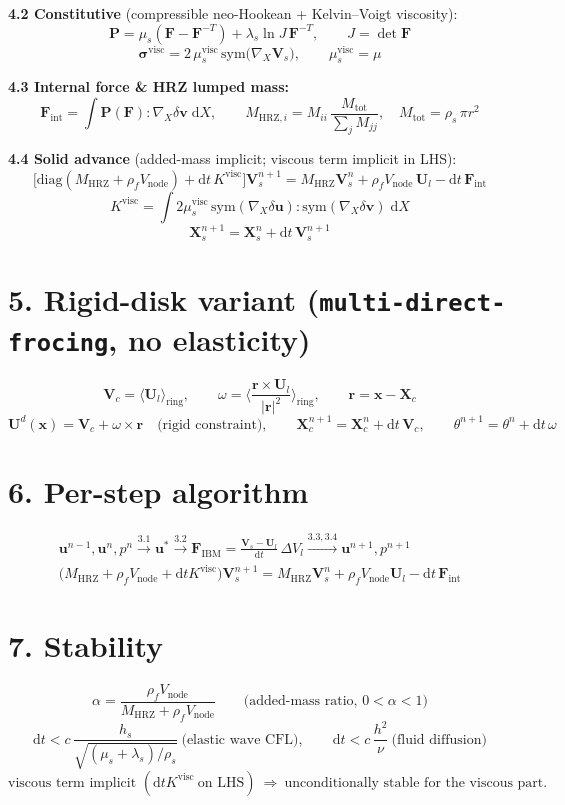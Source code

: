 \documentclass[10pt]{article}
\newcommand{\dd}{\mathrm{d}}
\begin{document}
\textbf{4.2 Constitutive} (compressible neo-Hookean + Kelvin--Voigt viscosity):
\[
\bm P = \mu_s(\bm F-\bm F^{-T})+\lambda_s\ln J\,\bm F^{-T},
\qquad J=\det\bm F
\]
\[
\bm\sigma^{\mathrm{visc}} = 2\,\mu_s^{\mathrm{visc}}\,\mathrm{sym}\big(\nabla_X \bm V_s\big),
\qquad \mu_s^{\mathrm{visc}}=\mu
\]

\textbf{4.3 Internal force \& HRZ lumped mass:}
\[
\bm F_{\mathrm{int}} = \int \bm P(\bm F):\nabla_X\delta\bm v\;\dd X,
\qquad
M_{\mathrm{HRZ},i}=M_{ii}\,\frac{M_{\mathrm{tot}}}{\sum_j M_{jj}},
\quad M_{\mathrm{tot}}=\rho_s\,\pi r^2
\]

\textbf{4.4 Solid advance} (added-mass implicit; viscous term implicit in LHS):
\[
\big[\mathrm{diag}(M_{\mathrm{HRZ}}+\rho_f V_{\mathrm{node}})+\dd t\,K^{\mathrm{visc}}\big]
\bm V_s^{n+1}
= M_{\mathrm{HRZ}}\bm V_s^n
+\rho_f V_{\mathrm{node}}\,\bm U_l
-\dd t\,\bm F_{\mathrm{int}}
\]
\[
K^{\mathrm{visc}} = \int 2\mu_s^{\mathrm{visc}}\,
\mathrm{sym}(\nabla_X\delta\bm u):\mathrm{sym}(\nabla_X\delta\bm v)\;\dd X
\]
\[
\bm X_s^{n+1} = \bm X_s^n + \dd t\,\bm V_s^{n+1}
\]

\section*{5. Rigid-disk variant (\texttt{multi-direct-frocing}, no elasticity)}
\[
\bm V_c=\big\langle \bm U_l\big\rangle_{\mathrm{ring}},
\qquad
\omega=\Big\langle\frac{\bm r\times\bm U_l}{|\bm r|^2}\Big\rangle_{\mathrm{ring}},
\qquad \bm r=\bm x-\bm X_c
\]
\[
\bm U^d(\bm x)=\bm V_c+\omega\times\bm r\quad\text{(rigid constraint)},
\qquad
\bm X_c^{n+1}=\bm X_c^n+\dd t\,\bm V_c,\qquad
\theta^{n+1}=\theta^n+\dd t\,\omega
\]

\section*{6. Per-step algorithm}
\[
\boxed{
\begin{gathered}
\bm u^{n-1},\bm u^n,p^n
\xrightarrow{3.1}\bm u^*
\xrightarrow{3.2}\bm F_{\mathrm{IBM}}=\tfrac{\bm V_s-\bm U_l}{\dd t}\,\Delta V_l
\xrightarrow{3.3,3.4}\bm u^{n+1},p^{n+1}\\[2mm]
\big(M_{\mathrm{HRZ}}+\rho_f V_{\mathrm{node}}+\dd t K^{\mathrm{visc}}\big)\bm V_s^{n+1}
= M_{\mathrm{HRZ}}\bm V_s^n+\rho_f V_{\mathrm{node}}\bm U_l-\dd t\,\bm F_{\mathrm{int}}
\end{gathered}
}
\]

\section*{7. Stability}
\[
\alpha=\frac{\rho_f V_{\mathrm{node}}}{M_{\mathrm{HRZ}}+\rho_f V_{\mathrm{node}}}
\qquad\text{(added-mass ratio, }0<\alpha<1\text{)}
\]
\[
\dd t<c\,\frac{h_s}{\sqrt{(\mu_s+\lambda_s)/\rho_s}}\ \text{(elastic wave CFL)},
\qquad
\dd t<c\,\frac{h^2}{\nu}\ \text{(fluid diffusion)}
\]
\[
\text{viscous term implicit }(\dd t K^{\mathrm{visc}}\ \text{on LHS})\ \Rightarrow\
\text{unconditionally stable for the viscous part.}
\]
\end{document}
